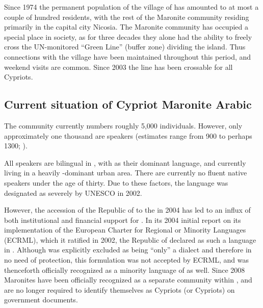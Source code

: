 \documentclass[output=paper]{langsci/langscibook}
\begin{document}
Since 1974 the permanent population of the village of  has amounted to at most a couple of hundred residents, with the rest of the Maronite community residing primarily in the capital city Nicosia. The Maronite community has occupied a special place in  society, as for three decades they alone had the ability to freely cross the UN-monitored “Green Line” (buffer zone) dividing the island. Thus connections with the village have been maintained throughout this period, and weekend visits are common. Since 2003 the line has been crossable for all Cypriots.

\subsection{Current situation of Cypriot Maronite Arabic}
The  community currently numbers roughly 5,000 individuals. However, only approximately one thousand are  speakers (estimates range from 900 to perhaps 1300; \citealt{CouncilofEurope2017}).


All  speakers are bilingual in  , with  as their dominant language, and currently living in a heavily -dominant urban area. There are currently no fluent native speakers under the age of thirty. Due to these factors, the  language was designated as severely  by UNESCO in 2002.

However, the accession of the Republic of  to the  in 2004 has led to an influx of both institutional and financial support for . In its 2004 initial report on its implementation of the European Charter for Regional or Minority Languages (ECRML), which it ratified in 2002, the Republic of  declared  as such a language in . Although  was explicitly excluded as being “only” a dialect and therefore in no need of protection, this formulation was not accepted by ECRML, and  was thenceforth officially recognized as a minority language of  as well. Since 2008 Maronites have been officially recognized as a separate community within , and are no longer required to identify themselves as  Cypriots (or  Cypriots) on government documents.
\end{document}
